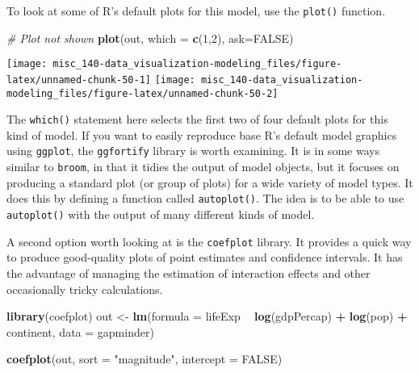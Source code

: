 \documentclass[]{book}
\newenvironment{Shaded}{\begin{snugshade}}{\end{snugshade}}
\newcommand{\CommentTok}[1]{\textcolor[rgb]{0.56,0.35,0.01}{\textit{#1}}}
\newcommand{\DataTypeTok}[1]{\textcolor[rgb]{0.13,0.29,0.53}{#1}}
\newcommand{\DecValTok}[1]{\textcolor[rgb]{0.00,0.00,0.81}{#1}}
\newcommand{\KeywordTok}[1]{\textcolor[rgb]{0.13,0.29,0.53}{\textbf{#1}}}
\newcommand{\NormalTok}[1]{#1}
\newcommand{\OperatorTok}[1]{\textcolor[rgb]{0.81,0.36,0.00}{\textbf{#1}}}
\newcommand{\OtherTok}[1]{\textcolor[rgb]{0.56,0.35,0.01}{#1}}
\newcommand{\StringTok}[1]{\textcolor[rgb]{0.31,0.60,0.02}{#1}}
\begin{document}
To look at some of R's default plots for this model, use the \texttt{plot()} function.\\

\begin{Shaded}
\begin{Highlighting}[]
\CommentTok{# Plot not shown}
\KeywordTok{plot}\NormalTok{(out, }\DataTypeTok{which =} \KeywordTok{c}\NormalTok{(}\DecValTok{1}\NormalTok{,}\DecValTok{2}\NormalTok{), }\DataTypeTok{ask=}\OtherTok{FALSE}\NormalTok{)}
\end{Highlighting}
\end{Shaded}

\begin{center}\texttt{[image: misc\_140-data\_visualization-modeling\_files/figure-latex/unnamed-chunk-50-1]} \texttt{[image: misc\_140-data\_visualization-modeling\_files/figure-latex/unnamed-chunk-50-2]} \end{center}

The \texttt{which()} statement here selects the first two of four default plots for this kind of model. If you want to easily reproduce base R's default model graphics using \texttt{ggplot}, the \texttt{ggfortify} library is worth examining. It is in some ways similar to \texttt{broom}, in that it tidies the output of model objects, but it focuses on producing a standard plot (or group of plots) for a wide variety of model types. It does this by defining a function called \texttt{autoplot()}. The idea is to be able to use \texttt{autoplot()} with the output of many different kinds of model.

A second option worth looking at is the \texttt{coefplot} library. It provides a quick way to produce good-quality plots of point estimates and confidence intervals. It has the advantage of managing the estimation of interaction effects and other occasionally tricky calculations.\\

\begin{Shaded}
\begin{Highlighting}[]
\KeywordTok{library}\NormalTok{(coefplot)}
\NormalTok{out <-}\StringTok{ }\KeywordTok{lm}\NormalTok{(}\DataTypeTok{formula =}\NormalTok{ lifeExp }\OperatorTok{~}\StringTok{ }\KeywordTok{log}\NormalTok{(gdpPercap) }\OperatorTok{+}\StringTok{ }\KeywordTok{log}\NormalTok{(pop) }\OperatorTok{+}\StringTok{ }\NormalTok{continent, }\DataTypeTok{data =}\NormalTok{ gapminder)}

\KeywordTok{coefplot}\NormalTok{(out, }\DataTypeTok{sort =} \StringTok{"magnitude"}\NormalTok{, }\DataTypeTok{intercept =} \OtherTok{FALSE}\NormalTok{)}
\end{Highlighting}
\end{Shaded}
\end{document}
